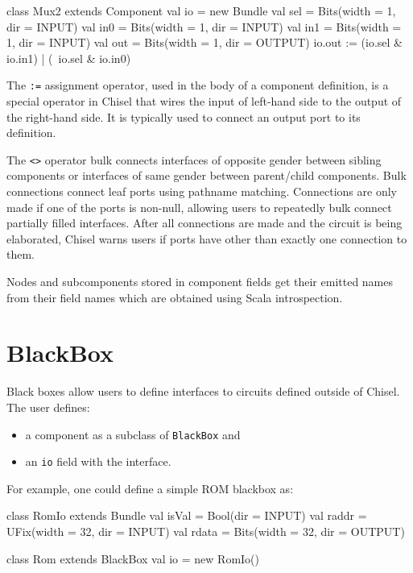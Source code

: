 \documentclass[10pt,twocolumn]{article}
\def\code#1{{\small\tt #1}}
\begin{document}
\begin{scala}
class Mux2 extends Component {
  val io = new Bundle{
    val sel = Bits(width = 1, dir = INPUT)
    val in0 = Bits(width = 1, dir = INPUT)
    val in1 = Bits(width = 1, dir = INPUT)
    val out = Bits(width = 1, dir = OUTPUT)
  }
  io.out := (io.sel & io.in1) | (~io.sel & io.in0)
}
\end{scala}

\noindent
The \code{:=} assignment operator, used in the body of a
component definition, is a special operator in Chisel that wires the input of
left-hand side to the output of the right-hand side.  It is typically
used to connect an output port to its definition.

The \code{<>} operator bulk connects interfaces of opposite gender between
sibling components or interfaces of same gender between parent/child components. 
Bulk connections connect leaf ports using pathname matching.
Connections are only made if one of the ports is non-null,
allowing users to repeatedly bulk connect partially filled interfaces.
After all connections are made and the circuit is being elaborated,
Chisel warns users if ports have other than exactly one connection to them.

Nodes and subcomponents stored in component fields get their emitted
names from their field names which are obtained using Scala introspection.


\section{BlackBox}

Black boxes allow users to define interfaces to circuits defined
outside of Chisel.  The user defines:

\begin{itemize}
\item a component as a subclass of \code{BlackBox} and
\item an \code{io} field with the interface.
\end{itemize}

\noindent
For example, one could define a simple ROM blackbox as:

\begin{scala}
class RomIo extends Bundle {
  val isVal = Bool(dir = INPUT)
  val raddr = UFix(width = 32, dir = INPUT)
  val rdata = Bits(width = 32, dir = OUTPUT)
}

class Rom extends BlackBox {
  val io = new RomIo()
}
\end{scala}
\end{document}
